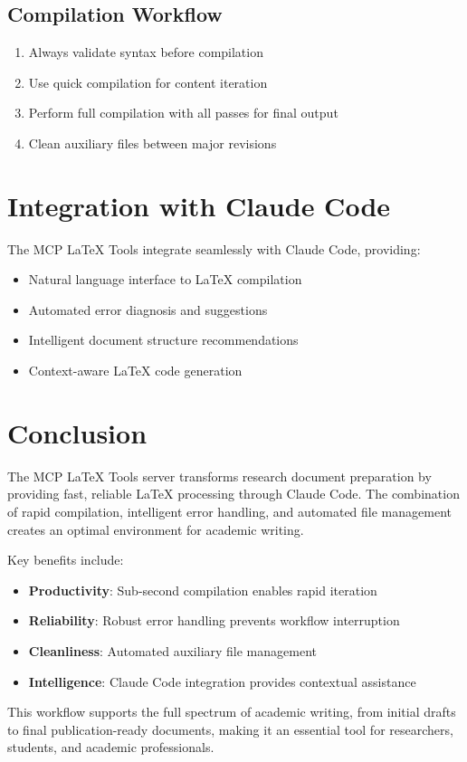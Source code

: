 \documentclass[12pt]{article}
\begin{document}
\subsection{Compilation Workflow}

\begin{enumerate}
    \item Always validate syntax before compilation
    \item Use quick compilation for content iteration
    \item Perform full compilation with all passes for final output
    \item Clean auxiliary files between major revisions
\end{enumerate}

\section{Integration with Claude Code}

The MCP LaTeX Tools integrate seamlessly with Claude Code, providing:

\begin{itemize}
    \item Natural language interface to LaTeX compilation
    \item Automated error diagnosis and suggestions
    \item Intelligent document structure recommendations
    \item Context-aware LaTeX code generation
\end{itemize}

\section{Conclusion}

The MCP LaTeX Tools server transforms research document preparation by providing fast, reliable LaTeX processing through Claude Code. The combination of rapid compilation, intelligent error handling, and automated file management creates an optimal environment for academic writing.

Key benefits include:

\begin{itemize}
    \item \textbf{Productivity}: Sub-second compilation enables rapid iteration
    \item \textbf{Reliability}: Robust error handling prevents workflow interruption
    \item \textbf{Cleanliness}: Automated auxiliary file management
    \item \textbf{Intelligence}: Claude Code integration provides contextual assistance
\end{itemize}

This workflow supports the full spectrum of academic writing, from initial drafts to final publication-ready documents, making it an essential tool for researchers, students, and academic professionals.
\end{document}
